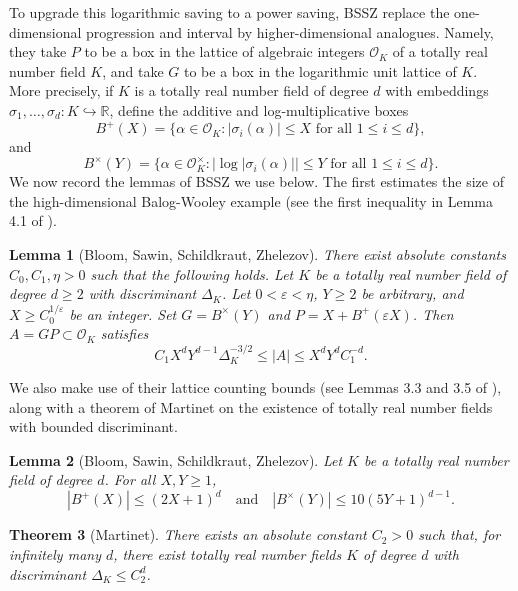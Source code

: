 \documentclass[11pt]{amsart}
\theoremstyle{plain}
\newtheorem{theorem}{Theorem}[section]
\newtheorem{lemma}[theorem]{Lemma}
\theoremstyle{definition}\newtheorem{remark}[theorem]{Remark}
\theoremstyle{definition}\newtheorem*{remark*}{Remark}
\theoremstyle{definition}\newtheorem{definition}[theorem]{Definition}
\theoremstyle{definition}\newtheorem*{definition*}{Definition}
\theoremstyle{definition}\newtheorem*{idea}{Idea}
\theoremstyle{definition}\newtheorem*{comments}{Comment}
\theoremstyle{definition}\newtheorem{example}[theorem]{Example}
\theoremstyle{definition}\newtheorem*{example*}{Example}
\newcommand{\0}{\varnothing} %
\renewcommand{\epsilon}{\varepsilon} %
\def\R{\mathbb{R}} %
\begin{document}
To upgrade this logarithmic saving to a power saving, BSSZ replace the one-dimensional progression and interval by higher-dimensional analogues. Namely, they take $P$ to be a box in the lattice of algebraic integers $\mathcal O_K$ of a totally real number field $K$, and take $G$ to be a box in the logarithmic unit lattice of $K$. More precisely, if $K$ is a totally real number field of degree $d$ with embeddings $\sigma_1,\dots,\sigma_d:K\hookrightarrow\R$, define the additive and log-multiplicative boxes
\[
B^+(X)=\{\alpha\in\mathcal O_K:|\sigma_i(\alpha)|\leq X\text{ for all }1\leq i\leq d\},
\]
and
\[
B^\times(Y)=\{\alpha\in \mathcal O_K^\times:|\log|\sigma_i(\alpha)||\leq Y\text{ for all }1\leq i\leq d\}.
\]
We now record the lemmas of BSSZ we use below. The first estimates the size of the high-dimensional Balog-Wooley example (see the first inequality in Lemma 4.1 of \cite{BloomSawinSchildkrautZhelezov2026}).
\begin{lemma}[Bloom, Sawin, Schildkraut, Zhelezov] There exist absolute constants $C_0,C_1,\eta>0$ such that the following holds. Let $K$ be a totally real number field of degree $d\geq 2$ with discriminant $\Delta_K$. Let $0<\epsilon<\eta$, $Y\geq2$ be arbitrary, and $X\geq C_0^{1/\epsilon}$ be an integer. Set $G=B^\times(Y)$ and $P=X+B^+(\epsilon X)$. Then $A=GP\subset\mathcal O_K$ satisfies
\[
C_1X^dY^{d-1}\Delta_K^{-3/2}\leq|A|\leq X^dY^dC_1^{-d}.
\]
\end{lemma}
We also make use of their lattice counting bounds (see Lemmas 3.3 and 3.5 of \cite{BloomSawinSchildkrautZhelezov2026}), along with a theorem of Martinet on the existence of totally real number fields with bounded discriminant. 
\begin{lemma}[Bloom, Sawin, Schildkraut, Zhelezov] Let $K$ be a totally real number field of degree $d$. For all $X,Y\geq 1$,
\[
|B^+(X)|\leq(2X+1)^d\quad\text{and}\quad|B^\times(Y)|\leq 10(5Y+1)^{d-1}.
\]
\end{lemma}

\begin{theorem}[Martinet] There exists an absolute constant $C_2>0$ such that, for infinitely many $d$, there exist totally real number fields $K$ of degree $d$ with discriminant $\Delta_K\leq C_2^d$. 
\end{theorem}
\end{document}
